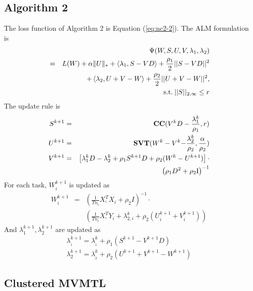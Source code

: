 \documentclass[twoside,leqno,twocolumn]{article}
\begin{document}
\subsection{Algorithm 2}

The loss function of Algorithm 2 is Equation (\ref{eq:nc2-2}). The ALM formulation is 
%
\begin{eqnarray}
\nonumber
&&{\Psi (W,S,U,V,{\lambda _1},{\lambda _2})}\\
\nonumber
&=& L(W)+\alpha\|U\|_{*}
+\left\langle {{\lambda_{1}},S-VD}\right\rangle  +\frac{{\rho_{1}}}{2}||S-VD|{|^{2}}\\
\nonumber
&& +\left\langle {{\lambda_{2}},U+V-W}\right\rangle +\frac{{\rho_{2}}}{2}||U+V-W|{|^{2}},\\
&& \:{\rm{s.t.}}\:||S|{|_{2,\infty}\leq r}
\label{eq:nc2-admm}
\end{eqnarray}
The update rule is
%
\begin{eqnarray}
\nonumber
{S^{k+1}} &=& {\rm {\textbf{CC}}}({V^k}D-\frac{{\lambda^k_{1}}}{{\rho_{1}}},r)\\
\nonumber
{U^{k+1}} &=& {\rm {\textbf{SVT}}}({W^{k}}-{V^{k}}{\rm {-}}\frac{{\lambda^k_{2}}}{{\rho_{2}}},\frac{\alpha}{{\rho_{2}}})\\
\nonumber
{V^{k+1}} &=& \left[{{\lambda^k_{1}}D-{\lambda^k_{2}}+{\rho_{1}}{S^{k+1}}D+{\rho_{2}}({W^{k}}-{U^{k+1}})}\right]\cdot \\
&&{\left({{\rho_{1}}{D^{2}}+{\rho_{2}}{\rm {I}}}\right)^{-1}}
\label{eq:admm2}
\end{eqnarray}
For each task, $W^{k + 1}_{i}$ is updated as
\begin{eqnarray}
\nonumber
W_{i}^{k+1}&=&{(\frac{1}{{T{n_{i}}}}X_{^{i}}^{T}{X_{i}}+{\rho_{2}}I)^{-1}}\cdot\\
&&\left(\frac{1}{{T{n_{i}}}}X_{^{i}}^{T}{Y_{i}}+{\lambda^k_{2,i}}+{\rho_{2}}(U_{i}^{k+1}+V_{i}^{k+1})\right)
\label{eq:nc2-w}
\end{eqnarray}
And ${\lambda^{k + 1}_{1}}, {\lambda^{k + 1}_{2}}$ are updated as
\begin{equation}
\begin{array}{*{20}{l}}
{\lambda _{_1}^{k + 1} = \lambda _{_1}^k + {\rho _1}({S^{k + 1}} - {V^{k + 1}}D)}\\
{\lambda _2^{k + 1} = \lambda _{_2}^k + {\rho _2}({U^{k + 1}} + {V^{k + 1}} - {W^{k + 1}})}
\end{array}
\label{eq:lambda2}
\end{equation}

\subsection{Clustered MVMTL}
\end{document}
